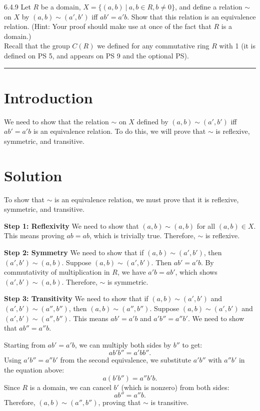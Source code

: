 \documentclass[12pt]{amsart}
\theoremstyle{definition}
\numberwithin{equation}{section}
\begin{document}
\newpage
\begin{exercise}{6.4.9} Let \(R\) be a domain, \(X = \{(a,b) \ | \ a,b \in R, b \neq 0 \} \), and define a relation \(\sim \) on \(X\) by \((a,b) \sim (a',b')\) iff \(ab' = a'b\). Show that this relation is an equivalence relation. (Hint: Your proof should make use at once of the fact that \(R\) is a domain.) \\
    Recall that the group \(C(R)\) we defined for any commutative ring \(R \) with 1 (it is defined on PS 5, and appears on PS 9 and the optional PS).

    \noindent\rule{\linewidth}{1pt}

    \section*{Introduction}
    We need to show that the relation \(\sim \) on \(X\) defined by \((a,b) \sim (a',b')\) iff \(ab' = a'b\) is an equivalence relation. To do this, we will prove that \(\sim \) is reflexive, symmetric, and transitive.

    \section*{Solution}
    To show that \(\sim \) is an equivalence relation, we must prove that it is reflexive, symmetric, and transitive.

    \noindent \textbf{Step 1: Reflexivity}
    We need to show that \((a,b) \sim (a,b)\) for all \((a,b) \in X\). This means proving \(ab = ab\), which is trivially true. Therefore, \(\sim \) is reflexive.

    \noindent \textbf{Step 2: Symmetry}
    We need to show that if \((a,b) \sim (a',b')\), then \((a',b') \sim (a,b)\). Suppose \((a,b) \sim (a',b')\). Then \(ab' = a'b\). By commutativity of multiplication in \(R\), we have \(a'b = ab'\), which shows \((a',b') \sim (a,b)\). Therefore, \(\sim \) is symmetric.

    \noindent \textbf{Step 3: Transitivity}
    We need to show that if \((a,b) \sim (a',b')\) and \((a',b') \sim (a'',b'')\), then \((a,b) \sim (a'',b'')\). Suppose \((a,b) \sim (a',b')\) and \((a',b') \sim (a'',b'')\). This means \(ab' = a'b\) and \(a'b'' = a''b'\). We need to show that \(ab'' = a''b\).

    Starting from \(ab' = a'b\), we can multiply both sides by \(b''\) to get:
    \[
    ab'b'' = a'b b''.
    \]
    Using \(a'b'' = a''b'\) from the second equivalence, we substitute \(a'b''\) with \(a''b'\) in the equation above:
    \[
    a(b'b'') = a''b'b.
    \]
    Since \(R\) is a domain, we can cancel \(b'\) (which is nonzero) from both sides:
    \[
    ab'' = a''b.
    \]
    Therefore, \((a,b) \sim (a'',b'')\), proving that \(\sim \) is transitive.


\end{exercise}
\end{document}
